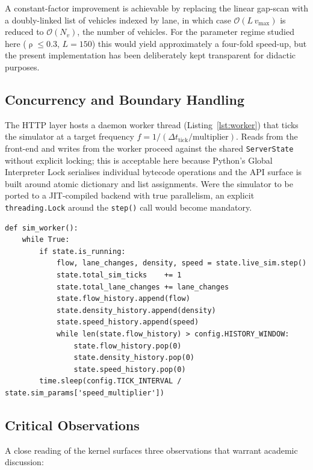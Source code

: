 \documentclass[11pt,a4paper]{article}
\DeclareMathOperator{\dens}{\rho}
\begin{document}
A constant-factor improvement is achievable by replacing the linear
gap-scan with a doubly-linked list of vehicles indexed by lane, in
which case $\mathcal{O}(L\,v_{\max})$ is reduced to $\mathcal{O}(N_v)$,
the number of vehicles. For the parameter regime studied here
($\dens \le 0.3$, $L=150$) this would yield approximately a four-fold
speed-up, but the present implementation has been deliberately kept
transparent for didactic purposes.

\subsection{Concurrency and Boundary Handling}

The HTTP layer hosts a daemon worker thread (Listing~\ref{lst:worker})
that ticks the simulator at a target frequency
$f = 1/(\Delta t_{\text{tick}}/\text{multiplier})$. Reads from the
front-end and writes from the worker proceed against the shared
\texttt{ServerState} without explicit locking; this is acceptable here
because Python's Global Interpreter Lock serialises individual bytecode
operations and the API surface is built around atomic dictionary and
list assignments. Were the simulator to be ported to a JIT-compiled
backend with true parallelism, an explicit \texttt{threading.Lock}
around the \texttt{step()} call would become mandatory.

\begin{lstlisting}[caption={The background simulation worker.},label={lst:worker}]
def sim_worker():
    while True:
        if state.is_running:
            flow, lane_changes, density, speed = state.live_sim.step()
            state.total_sim_ticks    += 1
            state.total_lane_changes += lane_changes
            state.flow_history.append(flow)
            state.density_history.append(density)
            state.speed_history.append(speed)
            while len(state.flow_history) > config.HISTORY_WINDOW:
                state.flow_history.pop(0)
                state.density_history.pop(0)
                state.speed_history.pop(0)
        time.sleep(config.TICK_INTERVAL / state.sim_params['speed_multiplier'])
\end{lstlisting}

\subsection{Critical Observations}

A close reading of the kernel surfaces three observations that warrant
academic discussion:
\end{document}
